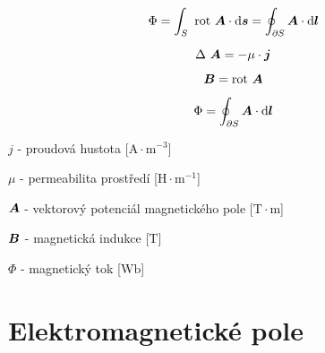\begin{equation}
\Phi = \int_S \ \mathrm{rot} \ \boldsymbol{A} \cdot \mathrm{d}\boldsymbol{s} = \oint_{\partial S} \boldsymbol{A} \cdot \mathrm{d}\boldsymbol{l}
\end{equation}

\begin{fact}
\begin{equation}
\Delta \ \boldsymbol{A} = -\mu \cdot \boldsymbol{j}
\end{equation}

\begin{equation}
\boldsymbol{B} = \mathrm{rot} \ \boldsymbol{A}
\end{equation}

\begin{equation}
\Phi = \oint_{\partial S} \boldsymbol{A} \cdot \mathrm{d}\boldsymbol{l}
\end{equation}

\(j\) - proudová hustota [\(\mathrm{A} \cdot \mathrm{m}^{-3}\)]

\(\mu\) - permeabilita prostředí [\(\mathrm{H} \cdot \mathrm{m}^{-1}\)]

\(\boldsymbol{A}\) - vektorový potenciál magnetického pole [\(\mathrm{T} \cdot \mathrm{m}\)]

\(\boldsymbol{B}\) - magnetická indukce [\(\mathrm{T}\)]

\(\Phi\) - magnetický tok [\(\mathrm{Wb}\)]
\end{fact}


\section{Elektromagnetické pole}
